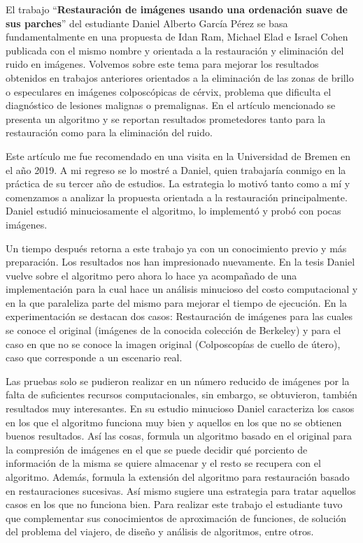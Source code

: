 \begin{opinion}

El trabajo “\textbf{Restauración de imágenes usando una ordenación suave de sus parches}” del estudiante Daniel Alberto García Pérez se basa fundamentalmente en una propuesta de Idan Ram, Michael Elad e Israel Cohen publicada con el mismo nombre y orientada a la restauración y eliminación del ruido en imágenes. 
Volvemos sobre este tema para mejorar los resultados obtenidos en trabajos anteriores orientados a la eliminación de las zonas de brillo o especulares en imágenes colposcópicas de cérvix, problema que dificulta el diagnóstico de lesiones malignas o premalignas. En el artículo mencionado se presenta un algoritmo y se reportan resultados prometedores tanto para la restauración como para la eliminación del ruido. 

Este artículo me fue recomendado en una visita en la Universidad de Bremen en el año 2019. A mi regreso se lo mostré a Daniel, quien trabajaría conmigo en la práctica de su tercer año de estudios. La estrategia lo motivó tanto como a m\'i y comenzamos a analizar la propuesta orientada a la restauración principalmente. Daniel estudió minuciosamente el algoritmo, lo implementó y probó con pocas imágenes.

Un tiempo después retorna a este trabajo ya con un conocimiento previo y m\'as preparación. Los resultados nos han impresionado nuevamente. En la tesis Daniel vuelve sobre el algoritmo pero ahora lo hace ya acompañado de una implementación para la cual hace un análisis minucioso del costo computacional y en la que paraleliza parte del mismo para mejorar el tiempo de ejecución. 
En la experimentación se destacan dos casos: Restauración de imágenes para las cuales se conoce el original (imágenes de la conocida colección de Berkeley) y para el caso en que no se conoce la imagen original (Colposcopías de cuello de útero), caso que corresponde a un escenario real.

Las pruebas solo se pudieron realizar en un número reducido de imágenes por la falta de suficientes recursos computacionales, sin embargo, se obtuvieron, también resultados muy interesantes. En su estudio minucioso Daniel caracteriza los casos en los que el algoritmo funciona muy bien y aquellos en los que no se obtienen buenos resultados. Así las cosas, formula un algoritmo basado en el original para la compresión de imágenes en el que se puede decidir qué porciento de información de la misma se quiere almacenar y el resto se recupera con el algoritmo. Además, formula la extensión del algoritmo para restauración basado en restauraciones sucesivas.  Así mismo sugiere una estrategia para tratar aquellos casos en los que no funciona bien.
Para realizar este trabajo el estudiante tuvo que complementar sus conocimientos de aproximación de funciones, de solución del problema del viajero, de diseño y análisis de algoritmos, entre otros.


\end{opinion}
